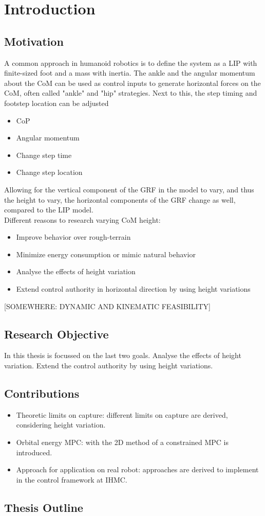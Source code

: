 %
\chapter{Introduction} \label{chap::intro}
\section{Motivation}
A common approach in humanoid robotics is to define the system as a \ac{LIP} with finite-sized foot and a mass with inertia. The ankle and the angular momentum about the \ac{CoM} can be used as control inputs to generate horizontal forces on the \ac{CoM}, often called "ankle" and "hip" strategies.  Next to this, the step timing and footstep location can be adjusted
\begin{itemize}
	\item \ac{CoP}
	\item Angular momentum
	\item Change step time
	\item Change step location
\end{itemize}

Allowing for the vertical component of the \ac{GRF} in the model to vary, and thus the height to vary, the horizontal components of the \ac{GRF} change as well, compared to the \ac{LIP} model.\\
Different reasons to research varying \ac{CoM} height: 
\begin{itemize}
	\item Improve behavior over rough-terrain
	\item Minimize energy consumption or mimic natural behavior
	\item Analyse the effects of height variation
	\item Extend control authority in horizontal direction by using height variations
\end{itemize}

[SOMEWHERE: DYNAMIC AND KINEMATIC FEASIBILITY]




\section{Research Objective}
In this thesis is focussed on the last two goals. Analyse the effects of height variation. Extend the control authority by using height variations. 

\section{Contributions}
\begin{itemize}
	\item Theoretic limits on capture: different limits on capture are derived, considering height variation.
	\item Orbital energy \ac{MPC}: with the \ac{2D} method of \cite{koolen2016balance} a constrained \ac{MPC} is introduced.
	\item Approach for application on real robot: approaches are derived to implement in the control framework at IHMC.
\end{itemize}
\section{Thesis Outline}


